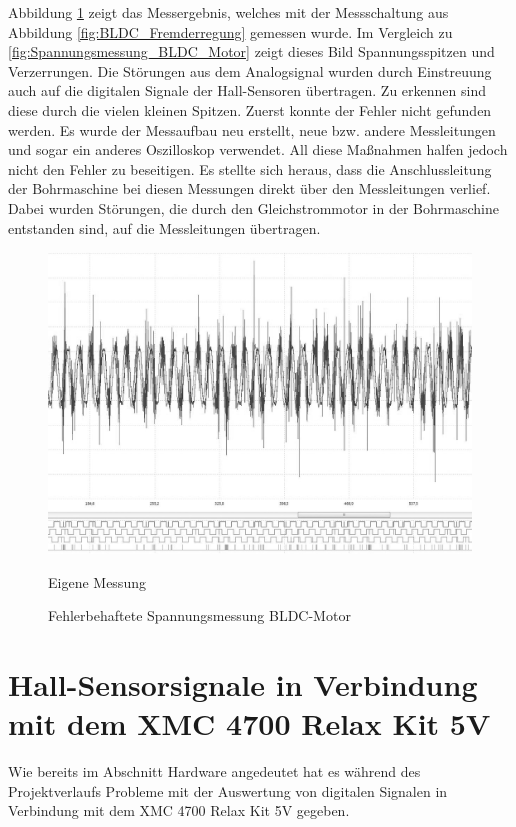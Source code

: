 Abbildung \ref{fig:Fehlerbehaftete_Spannungsmessung_BLDC_Motor} zeigt das Messergebnis, welches mit der Messschaltung aus Abbildung \ref{fig:BLDC_Fremderregung} gemessen wurde.
Im Vergleich zu \ref{fig:Spannungsmessung_BLDC_Motor} zeigt dieses Bild Spannungsspitzen und Verzerrungen.
Die Störungen aus dem Analogsignal wurden durch Einstreuung auch auf die digitalen Signale der Hall-Sensoren übertragen.
Zu erkennen sind diese durch die vielen kleinen Spitzen.
Zuerst konnte der Fehler nicht gefunden werden.
Es wurde der Messaufbau neu erstellt, neue bzw. andere Messleitungen und sogar ein anderes Oszilloskop verwendet.
All diese Maßnahmen halfen jedoch nicht den Fehler zu beseitigen.
Es stellte sich heraus, dass die Anschlussleitung der Bohrmaschine bei diesen Messungen direkt über den Messleitungen verlief.
Dabei wurden Störungen, die durch den Gleichstrommotor in der Bohrmaschine entstanden sind, auf die Messleitungen übertragen.


\begin{figure}[htbp]
	\centering
	\includegraphics[width=\textwidth-2cm]{tests/graphics/Fehlerhaftes_Spannungssignal}
	\caption{Fehlerbehaftete Spannungsmessung BLDC-Motor}
	\label{fig:Fehlerbehaftete_Spannungsmessung_BLDC_Motor}
	\quelle Eigene Messung
\end{figure}


\section{Hall-Sensorsignale in Verbindung mit dem XMC 4700 Relax Kit 5V}
Wie bereits im Abschnitt Hardware angedeutet hat es während des Projektverlaufs Probleme mit der Auswertung von digitalen Signalen in Verbindung mit dem XMC 4700 Relax Kit 5V gegeben.

